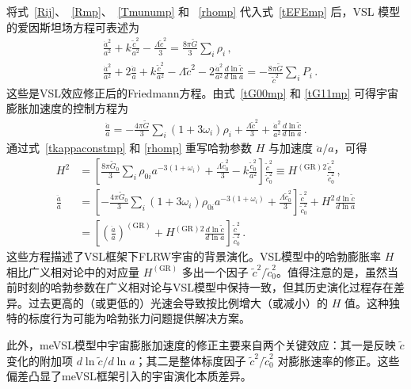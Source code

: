 \documentclass[jkps,preprint,fleqn]{revtex4}
\newcommand{\tc}{\tilde{c}}
\newcommand{\tG}{\tilde{G}}
\newcommand{\GR}{\text{GR}}
\begin{document}
将式~\eqref{Rij}、~\eqref{Rmp}、~\eqref{Tmunump} 和 ~\eqref{rhomp} 代入式~\eqref{tEFEmp} 后，VSL 模型的爱因斯坦场方程可表述为
 \begin{align}
 &\frac{\dot{a}^2}{a^2} + k \frac{\tc^2}{a^2}  -\frac{ \Lambda \tc^2}{3} = \frac{8 \pi \tG}{3} \sum_i \rho_i \label{tG00mp} \,, \\
 &\frac{\dot{a}^2}{a^2} + 2 \frac{\ddot{a}}{a} +  k \frac{\tc^2}{a^2} - \Lambda \tc^2 - 2 \frac{\dot{a}^2}{a^2} \frac{d \ln \tc}{d \ln a} = -\frac{8 \pi \tG}{\tc^2} \sum_{i} P_i  \label{tG11mp} \,.
 \end{align}
这些是VSL效应修正后的Friedmann方程。由式~\eqref{tG00mp} 和 \eqref{tG11mp} 可得宇宙膨胀加速度的控制方程为
 \begin{align}
 \frac{\ddot{a}}{a} = -\frac{4\pi \tG}{3} \sum_i \left( 1 + 3 \omega_i \right) \rho_i  + \frac{\Lambda \tc^2}{3} + \frac{\dot{a}^2}{a^2} \frac{d \ln \tc}{d \ln a} \label{t3G11mG00mp} \,.
 \end{align}
通过式~\eqref{tkappaconstmp} 和 \eqref{rhomp} 重写哈勃参数 $H$ 与加速度 $\ddot{a}/a$，可得
 \begin{align}
 H^2 &= \left[ \frac{8 \pi \tG_0}{3} \sum_{i} \rho_{0i} a^{-3(1+\omega_i)} + \frac{ \Lambda \tc_0^2}{3} - k \frac{\tc_0^2}{a^2} \right] \frac{\tc^2}{\tc_0^2} \equiv H^{(\GR)2} \frac{\tc^2}{\tc_0^2} \label{H2me} \,, \\
 \frac{\ddot{a}}{a} &= \left[ -\frac{4\pi \tG_0}{3} \sum_i \left( 1 + 3 \omega_i \right) \rho_{0i} a^{-3(1+\omega_i)} + \frac{\Lambda \tc_0^2}{3} \right] \frac{\tc^2}{\tc_0^2} + H^2 \frac{d \ln \tc}{d \ln a} \nonumber \\
 &= \left[ \left( \frac{\ddot{a}}{a} \right)^{(\GR)} +  H^{(\GR)2} \frac{d \ln \tc}{d \ln a}  \right] \frac{\tc^2}{\tc_0^2} \label{ddotaoa} \,.
 \end{align}
这些方程描述了VSL框架下FLRW宇宙的背景演化。VSL模型中的哈勃膨胀率 $H$ 相比广义相对论中的对应量 $H^{(\GR)}$ 多出一个因子 $\tc^2/\tc_0^2$。值得注意的是，虽然当前时刻的哈勃参数在广义相对论与VSL模型中保持一致，但其历史演化过程存在差异。过去更高的（或更低的）光速会导致按比例增大（或减小）的 $H$ 值。这种独特的标度行为可能为哈勃张力问题提供解决方案。

此外，meVSL模型中宇宙膨胀加速度的修正主要来自两个关键效应：其一是反映 $\tc$ 变化的附加项 $d \ln \tc/d \ln a$；其二是整体标度因子 $\tc^2/\tc_0^2$ 对膨胀速率的修正。这些偏差凸显了meVSL框架引入的宇宙演化本质差异。
\end{document}
